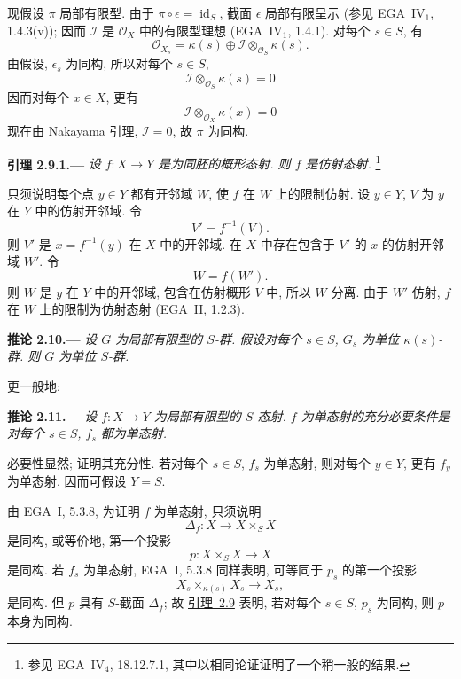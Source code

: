 现假设 \(\pi\) 局部有限型.
由于 \(\pi\circ\epsilon=\operatorname{id}_S\),
截面 \(\epsilon\) 局部有限呈示 (参见 EGA~IV\(_1\), 1.4.3(v));
因而 \(\mathcal I\) 是 \(\mathcal O_X\) 中的有限型理想
(EGA~IV\(_1\), 1.4.1). 对每个 \(s\in S\), 有
\[
  \mathcal O_{X_s}
    =\kappa(s)\oplus
      \mathcal I\otimes_{\mathcal O_S}\kappa(s).
\]
由假设, \(\epsilon_s\) 为同构, 所以对每个 \(s\in S\),
\[
  \mathcal I\otimes_{\mathcal O_S}\kappa(s)=0
\]
因而对每个 \(x\in X\), 更有
\[
  \mathcal I\otimes_{\mathcal O_X}\kappa(x)=0
\]
现在由 Nakayama 引理, \(\mathcal I=0\), 故 \(\pi\) 为同构.

\medskip
{}\label{lem:sga3-VIB-2.9.1}%
\noindent\textbf{引理 2.9.1.---}
\emph{设 \(f:X\to Y\) 是为同胚的概形态射. 则 \(f\) 是仿射态射.}%
\begingroup
\renewcommand{\thefootnote}{\ensuremath{(\ast\ast\ast)}}%
\footnote[3]{\label{note:sga3-VIB-2.9.1-starstarstar}
参见 EGA~IV\(_4\), 18.12.7.1, 其中以相同论证证明了一个稍一般的结果.}%
\endgroup

只须说明每个点 \(y\in Y\) 都有开邻域 \(W\),
使 \(f\) 在 \(W\) 上的限制仿射.
设 \(y\in Y\), \(V\) 为 \(y\) 在 \(Y\) 中的仿射开邻域. 令
\[
  V'=f^{-1}(V).
\]
则 \(V'\) 是 \(x=f^{-1}(y)\) 在 \(X\) 中的开邻域.
在 \(X\) 中存在包含于 \(V'\) 的 \(x\) 的仿射开邻域 \(W'\).
令
\[
  W=f(W').
\]
则 \(W\) 是 \(y\) 在 \(Y\) 中的开邻域,
包含在仿射概形 \(V\) 中, 所以 \(W\) 分离.
由于 \(W'\) 仿射, \(f\) 在 \(W\) 上的限制为仿射态射
(EGA~II, 1.2.3).

\medskip
{}\label{cor:sga3-VIB-2.10}%
\noindent\textbf{推论 2.10.---}
\emph{设 \(G\) 为局部有限型的 \(S\)-群.
假设对每个 \(s\in S\), \(G_s\) 为单位 \(\kappa(s)\)-群.
则 \(G\) 为单位 \(S\)-群.}

更一般地:

\medskip
{}\label{cor:sga3-VIB-2.11}%
\noindent\textbf{推论 2.11.---}
\emph{设 \(f:X\to Y\) 为局部有限型的 \(S\)-态射.
\(f\) 为单态射的充分必要条件是对每个 \(s\in S\),
\(f_s\) 都为单态射.}

必要性显然; 证明其充分性.
若对每个 \(s\in S\), \(f_s\) 为单态射,
则对每个 \(y\in Y\), 更有 \(f_y\) 为单态射.
因而可假设 \(Y=S\).

由 EGA~I, 5.3.8, 为证明 \(f\) 为单态射, 只须说明
\[
  \Delta_f:X\longrightarrow X\times_SX
\]
是同构, 或等价地, 第一个投影
\[
  p:X\times_SX\longrightarrow X
\]
是同构. 若 \(f_s\) 为单态射, EGA~I, 5.3.8 同样表明,
可等同于 \(p_s\) 的第一个投影
\[
  X_s\times_{\kappa(s)}X_s\longrightarrow X_s,
\]
是同构. 但 \(p\) 具有 \(S\)-截面 \(\Delta_f\);
故 \hyperref[lem:sga3-VIB-2.9]{引理~2.9} 表明,
若对每个 \(s\in S\), \(p_s\) 为同构, 则 \(p\) 本身为同构.

